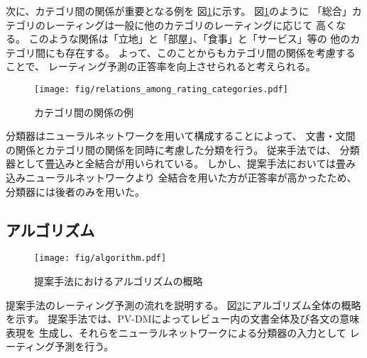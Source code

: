 次に、カテゴリ間の関係が重要となる例を
図\ref{fig:RelationsAmongRatingCategories}に示す。
図\ref{fig:RelationsAmongRatingCategories}のように
「総合」カテゴリのレーティングは一般に他のカテゴリのレーティングに応じて
高くなる。
このような関係は「立地」と「部屋」、「食事」と「サービス」等の
他のカテゴリ間にも存在する。
よって、このことからもカテゴリ間の関係を考慮することで、
レーティング予測の正答率を向上させられると考えられる。

\begin{figure}
  \texttt{[image: fig/relations\_among\_rating\_categories.pdf]}
  \caption{カテゴリ間の関係の例}
  \label{fig:RelationsAmongRatingCategories}
\end{figure}

分類器はニューラルネットワークを用いて構成することによって、
文書・文間の関係とカテゴリ間の関係を同時に考慮した分類を行う。
従来手法\cite{nal14,rie14,duyu15}では、
分類器として畳込み\nn と全結合\nn が用いられている。
しかし、提案手法においては畳み込みニューラルネットワークより
全結合\nn を用いた方が正答率が高かったため、分類器には後者のみを用いた。


\subsection{アルゴリズム}

\begin{figure}
  \texttt{[image: fig/algorithm.pdf]}
  \caption{提案手法におけるアルゴリズムの概略}
  \label{fig:MyAlgorithm}
\end{figure}

提案手法のレーティング予測の流れを説明する。
図\ref{fig:MyAlgorithm}にアルゴリズム全体の概略を示す。
提案手法では、PV-DMによってレビュー内の文書全体及び各文の意味表現を
生成し、それらをニューラルネットワークによる分類器の入力として
レーティング予測を行う。

